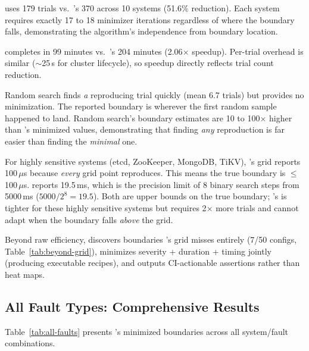  \system{} uses 179 trials vs.\ \xinda{}'s 370 across
10 systems (51.6\% reduction). Each system requires exactly 17 to 18 minimizer
iterations regardless of where the boundary falls, demonstrating the
algorithm's independence from boundary location.

 \system{} completes in 99 minutes vs.\ \xinda{}'s 204
minutes (2.06$\times$ speedup). Per-trial overhead is similar ($\sim$25\,s for
cluster lifecycle), so speedup directly reflects trial count reduction.

 Random search finds \emph{a} reproducing trial
quickly (mean 6.7 trials) but provides no minimization. The reported boundary
is wherever the first random sample happened to land. Random search's boundary
estimates are 10 to 100$\times$ higher than \system{}'s minimized values,
demonstrating that finding \emph{any} reproduction is far easier than finding
the \emph{minimal} one.

 For highly sensitive systems (etcd, ZooKeeper,
MongoDB, TiKV), \xinda{}'s grid reports 100\,$\mu$s because
\emph{every} grid point reproduces. This means the true boundary is $\leq$
100\,$\mu$s. \system{} reports 19.5\,ms, which is the precision limit of 8
binary search steps from 5000\,ms ($5000/2^8 = 19.5$). Both are upper bounds
on the true boundary; \xinda{}'s is tighter for these highly sensitive systems
but requires 2$\times$ more trials and cannot adapt when the boundary falls
\emph{above} the grid.

 Beyond raw efficiency, \system{} discovers boundaries
\xinda{}'s grid misses entirely (7/50 configs, Table~\ref{tab:beyond-grid}),
minimizes severity + duration + timing jointly (producing executable recipes),
and outputs CI-actionable assertions rather than heat maps.

\subsection{All Fault Types: Comprehensive Results}
\label{sec:recipes-all}

Table~\ref{tab:all-faults} presents \system{}'s minimized boundaries across
all system/fault combinations.

